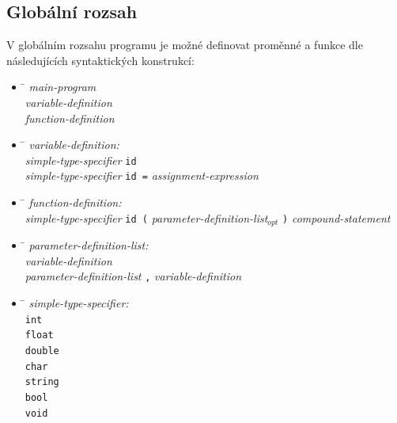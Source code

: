 \subsection*{Globální rozsah}
V globálním rozsahu programu je možné definovat proměnné a funkce dle následujících syntaktických konstrukcí:
\begin{itemize}


  \item \begin{tabbing}
  \qquad \qquad \= \kill
  \emph{main-program}\\
  \> \emph{variable-definition} \\
  \> \emph{function-definition}
\end{tabbing}

\item \begin{tabbing}
  \qquad \qquad \= \kill
  \emph{variable-definition:}\\
  \> \emph{simple-type-specifier} \verb|id| \\
  \> \emph{simple-type-specifier} \verb|id =| \emph{assignment-expression}
\end{tabbing}

\item \begin{tabbing}
  \qquad \qquad \= \kill
  \emph{function-definition:}\\
  \> \emph{simple-type-specifier} \verb|id (| \emph{parameter-definition-list$_{opt}$} \verb|)| \emph{compound-statement}
\end{tabbing}

\item \begin{tabbing}
  \qquad \qquad \= \kill
  \emph{parameter-definition-list:}\\
  \> \emph{variable-definition}\\
  \> \emph{parameter-definition-list} \verb|,| \emph{variable-definition}
\end{tabbing}

\item \begin{tabbing}
  \qquad \qquad \= \kill
  \emph{simple-type-specifier:}\\
  \> \verb|int| \\
  \> \verb|float| \\
  \> \verb|double| \\
  \> \verb|char| \\
  \> \verb|string| \\
  \> \verb|bool| \\
  \> \verb|void|
\end{tabbing}
\end{itemize}

